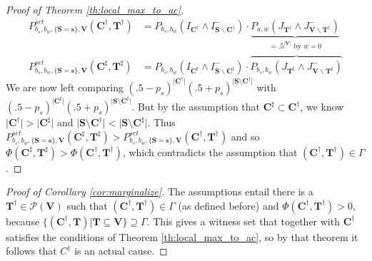 \documentclass[anon,12pt]{clear2025} %
\begin{document}
\begin{proof}[Proof of Theorem \ref{th:local_max_to_ac}]
\begin{align}
P^{\mathit{set}}_{b_s,b_w, \{\mathbf{S}  =\mathbf{s}\}, \mathbf{V}}(\mathbf{C^\dagger},\mathbf{T^\dagger}) & =  P_{b_s, b_w}\left(I_{\mathbf{C^\dagger}} \wedge I^-_{\mathbf{S} \backslash \mathbf{C^\dagger}}\right) \cdot \underbrace{P_{a,w} \left( J_{\mathbf{T^\dagger}}  \wedge J^-_{\mathbf{V} \backslash \mathbf{T^\dagger}} \right)}_{ = .5^{\vert \mathbf{V} \vert} \text{ by $w=0$}}\\
P^{\mathit{set}}_{b_s,b_w, \{\mathbf{S}=\mathbf{s}\}, \mathbf{V}}(\mathbf{C^\sharp},\mathbf{T^\sharp}) & =  P_{b_s, b_w}\left(I_{\mathbf{C^\sharp}} \wedge I^-_{\mathbf{S} \backslash \mathbf{C^\sharp}}  \right) \cdot \overbrace{P_{b_s,b_w}  \left(  J_{\mathbf{T^\sharp}}  \wedge J^-_{\mathbf{V} \backslash \mathbf{T^\sharp}} \right)}
\end{align}
\noindent We are now left comparing $(.5-p_s)^{\vert \mathbf{C^\dagger}\vert } (.5+p_s)^{\vert \mathbf{S}\setminus{\mathbf{C^\dagger}}\vert}$ with $(.5-p_s)^{\vert \mathbf{C^\sharp}\vert } (.5+p_s)^{\vert \mathbf{S}\setminus{\mathbf{C^\sharp}}\vert}$. But by the assumption that $\mathbf{C^\sharp} \subset \mathbf{C^\dagger}$, we know $\vert \mathbf{C^\dagger}\vert > \vert \mathbf{C^\sharp}\vert$ and $\vert \mathbf{S}\setminus{\mathbf{C^\dagger}}\vert < \vert \mathbf{S}\setminus{\mathbf{C^\sharp}}\vert$. Thus $P^{\mathit{set}}_{b_s,b_w, \{\mathbf{S}=\mathbf{s}\}, \mathbf{V}}(\mathbf{C^\sharp},\mathbf{T^\sharp}) > P^{\mathit{set}}_{b_s,b_w, \{\mathbf{S}  =\mathbf{s}\}, \mathbf{V}}(\mathbf{C^\dagger},\mathbf{T^\dagger})$ and so $\Phi(\mathbf{C^\sharp}, \mathbf{T^\sharp}) > \Phi(\mathbf{C^\dagger}, \mathbf{T^\dagger})$, which  contradicts the assumption that $(\mathbf{C^\dagger}, \mathbf{T^\dagger}) \in \Gamma$.
\end{proof}




\begin{proof}[Proof of Corollary \ref{cor:marginalize}]
The assumptions entail there is a $\mathbf{T^\dagger}\in \mathcal{P}(\mathbf{V})$ such that $(\mathbf{C^\dagger}, \mathbf{T^\dagger}) \in \Gamma$ (as defined before) and $\Phi(\mathbf{C^\dagger}, \mathbf{T^\dagger})>0$, because $\{(\mathbf{C^\dagger}, \mathbf{T})\vert \mathbf{T}\subseteq \mathbf{V}\} \supseteq \Gamma$. This gives a witness set that together with $\mathbf{C^\dagger}$ satisfies the conditions of Theorem \ref{th:local_max_to_ac}, so by that theorem it follows that $C^\dagger$ is an actual cause.
\end{proof}
\end{document}
